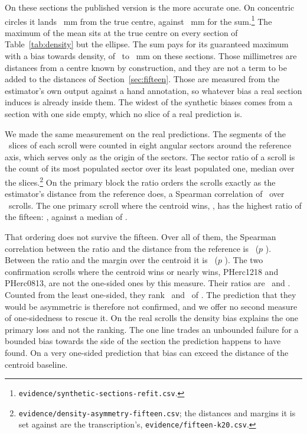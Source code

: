 On these sections the published version is the more accurate one. On concentric circles it lands
\RevSynCircleAsIs~mm from the true centre, against \RevSynCircleFixed~mm for the
sum.\footnote{\texttt{evidence/synthetic-sections-refit.csv}.} The maximum of the mean sits at the
true centre on every section of Table~\ref{tab:density} but the ellipse. The sum pays for its guaranteed maximum with a bias towards density, of
\RevDensCircleOneSumFieldErrMm\ to \RevDensHalfSumFieldErrMm~mm on these sections. Those
millimetres are distances from a centre known by construction, and they are not a term to be added
to the distances of Section~\ref{sec:fifteen}. Those are measured from the estimator's own output
against a hand annotation, so whatever bias a real section induces is already inside them. The
widest of the synthetic biases comes from a section with one side empty, which no slice of a real
prediction is.

We made the same measurement on the real predictions. The segments of the \RevFifteenSlices\
slices of each scroll were counted in eight angular sectors around the reference axis, which serves
only as the origin of the sectors. The sector ratio of a scroll is the count of its most populated
sector over its least populated one, median over the slices.\footnote{\texttt{evidence/density-asymmetry-fifteen.csv};
the distances and margins it is set against are the transcription's, \texttt{evidence/fifteen-k20.csv}.}
On the primary block the ratio orders the scrolls exactly as the estimator's distance from the
reference does, a Spearman correlation of \RevAsymPrimaryErrRho\ over \RevAsymPrimaryErrN\ scrolls.
The one primary scroll where the centroid wins, \RevAsymWorstScroll, has the highest ratio of the
fifteen: \RevAsymWorstRatio, against a median of \RevAsymFifteenRatioMedian.

That ordering does not survive the fifteen. Over all of them, the Spearman correlation between the
ratio and the distance from the reference is \RevAsymFifteenErrRho\ ($p$ \RevAsymFifteenErrP).
Between the ratio and the margin over the centroid it is \RevAsymFifteenMarginRho\ ($p$
\RevAsymFifteenMarginP). The two confirmation scrolls where the centroid wins or nearly wins,
PHerc1218 and PHerc0813, are not the one-sided ones by this measure. Their ratios are
\RevAsymOneTwoOneEightRatio\ and \RevAsymZeroEightOneThreeRatio. Counted from the least one-sided,
they rank \RevAsymOneTwoOneEightRank\ and \RevAsymZeroEightOneThreeRank\ of
\RevAsymFifteenScrolls. The prediction that they would be asymmetric is therefore not confirmed,
and we offer no second measure of one-sidedness to rescue it. On the real scrolls the density bias
explains the one primary loss and not the ranking. The one line trades an unbounded failure for a
bounded bias towards the side of the section the prediction happens to have found. On a very
one-sided prediction that bias can exceed the distance of the centroid baseline.

